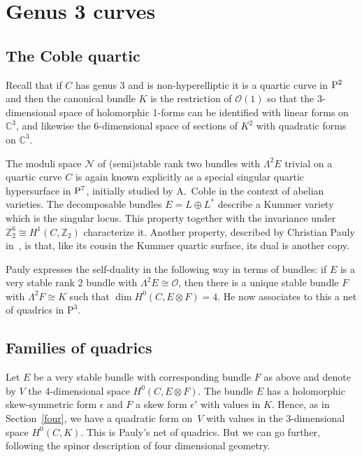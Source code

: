 \documentclass[pdftex]{sigma}
\numberwithin{equation}{section}
\begin{document}
\section{Genus 3 curves}
\subsection{The Coble quartic}

Recall that if $C$ has genus $3$ and is non-hyperelliptic it is a quartic curve in ${\rm P}^2$ and then the canonical bundle $K$ is the restriction of $\mathcal{O}(1)$ so that the 3-dimensional space of holomorphic 1-forms can be identified with linear forms on ${\mathbb C}^3$, and likewise the 6-dimensional space of sections of $K^2$ with quadratic forms on ${\mathbb C}^3$.

The moduli space ${\mathcal N}$ of (semi)stable rank two bundles with $\Lambda^2E$ trivial on a quartic curve $C$ is again known explicitly \cite{Narasimhan/Ramanan1987} as a special singular quartic hypersurface in ${\rm P}^7$, initially studied by A.~Coble in the context of abelian varieties. The decomposable bundles $E=L\oplus L^*$ describe a Kummer variety which is the singular locus. This property together with the invariance under ${\mathbb Z}_2^6\cong H^1(C,{\mathbb Z}_2)$ characterize it. Another property, described by Christian Pauly in~\cite{Pauly}, is that, like its cousin the Kummer quartic surface, its dual is another copy.

Pauly expresses the self-duality in the following way in terms of bundles: if $E$ is a very stable rank $2$ bundle with $\Lambda^2E\cong \mathcal{O}$, then there is a unique stable bundle $F$ with $\Lambda^2F\cong K$ such that $\dim H^0(C, E\otimes F)=4$. He now associates to this a net of quadrics in $\mathrm{P}^3$.

\subsection{Families of quadrics}\label{sd}
Let $E$ be a very stable bundle with corresponding bundle $F$ as above and denote by $V$ the 4-dimensional space $H^0(C, E\otimes F)$. The bundle $E$ has a holomorphic skew-symmetric form $\epsilon$ and $F$ a skew form $\epsilon'$ with values in $K$. Hence, as in Section~\ref{four}, we have a quadratic form on~$V$ with values in the 3-dimensional space $H^0(C,K)$. This is Pauly's net of quadrics. But we can go further, following the spinor description of four dimensional geometry.
\end{document}
